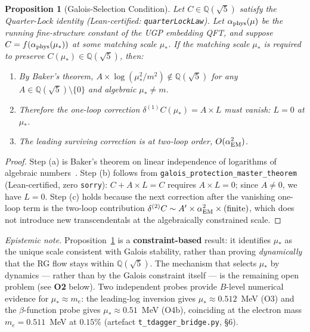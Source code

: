 \documentclass[11pt]{article}
\newtheorem{proposition}[theorem]{Proposition}
\theoremstyle{remark}
\begin{document}
\begin{proposition}[Galois-Selection Condition]
\label{prop:galois_selection}
Let $C \in \mathbb{Q}(\sqrt{5})$ satisfy the Quarter-Lock identity
(Lean-certified: \texttt{quarterLockLaw}).
Let $\alpha_{\rm phys}(\mu)$ be the running fine-structure constant of the
UGP embedding QFT, and suppose $C = f(\alpha_{\rm phys}(\mu_*))$ at some
matching scale $\mu_*$.
If the matching scale $\mu_*$ is required to preserve $C(\mu_*) \in \mathbb{Q}(\sqrt{5})$, then:
\begin{enumerate}[label=\emph{(\alph*)},itemsep=0pt,topsep=2pt]
  \item By Baker's theorem, $A \times \log(\mu_*^2/m^2) \notin \mathbb{Q}(\sqrt{5})$
        for any $A \in \mathbb{Q}(\sqrt{5}) \setminus \{0\}$ and algebraic $\mu_* \neq m$.
  \item Therefore the one-loop correction $\delta^{(1)}C(\mu_*) = A \times L$ must
        vanish: $L = 0$ at $\mu_*$.
  \item The leading surviving correction is at two-loop order, $O(\alpha_{\rm EM}^2)$.
\end{enumerate}
\end{proposition}

\begin{proof}
Step (a) is Baker's theorem on linear independence of logarithms of algebraic
numbers~\cite{Baker1975}.  Step (b) follows from
\texttt{galois\_protection\_master\_theorem} (Lean-certified, zero \texttt{sorry}):
$C + A \times L = C$ requires $A \times L = 0$; since $A \neq 0$, we have $L = 0$.
Step (c) holds because the next correction after the vanishing one-loop term is
the two-loop contribution $\delta^{(2)}C \sim A' \times \alpha_{\rm EM}^2 \times (\text{finite})$,
which does not introduce new transcendentals at the algebraically constrained scale.
\end{proof}

\noindent\textit{Epistemic note.}
Proposition~\ref{prop:galois_selection} is a \textbf{constraint-based} result:
it identifies $\mu_*$ as the unique scale consistent with Galois stability,
rather than proving \emph{dynamically} that the RG flow stays within $\mathbb{Q}(\sqrt{5})$.
The mechanism that selects $\mu_*$ by dynamics --- rather than by the Galois constraint
itself --- is the remaining open problem (see \textbf{O2} below).
Two independent probes provide $B$-level numerical evidence for $\mu_* \approx m_e$:
the leading-log inversion gives $\mu_* \approx 0.512$~MeV (O3) and
the $\beta$-function probe gives $\mu_* \approx 0.51$~MeV (O4b),
coinciding at the electron mass $m_e = 0.511$~MeV at $0.15\%$
(artefact \texttt{t\_tdagger\_bridge.py}, §6).
\end{document}
